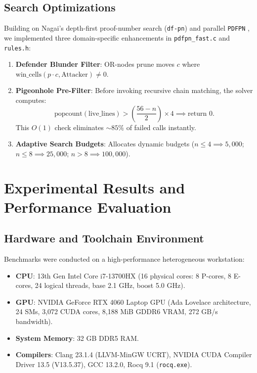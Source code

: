 \documentclass[11pt,reqno]{amsart}
\theoremstyle{plain}
\theoremstyle{definition}
\theoremstyle{remark}
\begin{document}
\subsection{Search Optimizations}
Building on Nagai's depth-first proof-number search (\texttt{df-pn}) \cite{nagai2002dfpn} and parallel \texttt{PDFPN} \cite{kaneko2010parallel,pawlewicz2013scalable}, we implemented three domain-specific enhancements in \texttt{pdfpn\_fast.c} and \texttt{rules.h}:
\begin{enumerate}
    \item \textbf{Defender Blunder Filter}: OR-nodes prune moves $c$ where $\text{win\_cells}(p \cdot c, \text{Attacker}) \ne 0$.
    \item \textbf{Pigeonhole Pre-Filter}: Before invoking recursive chain matching, the solver computes:
    $$\text{popcount}(\text{live\_lines}) > \left(\frac{56 - n}{2}\right) \times 4 \implies \text{return } 0.$$
    This $O(1)$ check eliminates $\sim 85\%$ of failed calls instantly.
    \item \textbf{Adaptive Search Budgets}: Allocates dynamic budgets ($n \le 4 \implies 5,000$; $n \le 8 \implies 25,000$; $n > 8 \implies 100,000$).
\end{enumerate}

\section{Experimental Results and Performance Evaluation}

\subsection{Hardware and Toolchain Environment}
Benchmarks were conducted on a high-performance heterogeneous workstation:
\begin{itemize}
    \item \textbf{CPU}: 13th Gen Intel Core i7-13700HX (16 physical cores: 8 P-cores, 8 E-cores, 24 logical threads, base 2.1 GHz, boost 5.0 GHz).
    \item \textbf{GPU}: NVIDIA GeForce RTX 4060 Laptop GPU (Ada Lovelace architecture, 24 SMs, 3,072 CUDA cores, 8,188 MiB GDDR6 VRAM, 272 GB/s bandwidth).
    \item \textbf{System Memory}: 32 GB DDR5 RAM.
    \item \textbf{Compilers}: Clang 23.1.4 (LLVM-MinGW UCRT), NVIDIA CUDA Compiler Driver 13.5 (V13.5.37), GCC 13.2.0, Rocq 9.1 (\texttt{rocq.exe}).
\end{itemize}
\end{document}
